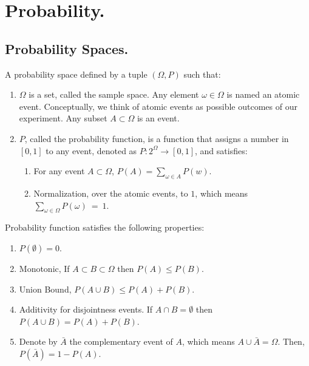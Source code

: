 


\ifdefined\BOOK
\else
\setcounter{chapter}{6}
\fi
\chapter{Probability.} 

\section{ Probability Spaces. }

\begin{definition}
  A probability space defined by a tuple $(\Omega,P)$ such that:
  \begin{enumerate} 
    \item $\Omega$ is a set, called the sample space. Any element $\omega\in \Omega$ is named an atomic event. Conceptually, we think of atomic events as possible outcomes of our experiment. Any subset $A \subset \Omega$ is an event. 
    \item $P$, called the probability function, is a function that assigns a number in $[0,1]$ to any event, denoted as $P : 2^\Omega \rightarrow [0,1]$, and satisfies:
      \begin{enumerate}
        \item For any event $A \subset \Omega$, $P(A) = \sum_{\omega\in A}P(w)$. 
        \item Normalization, over the atomic events, to $1$, which means $\sum_{\omega\in\Omega}P(\omega)~=~1$.
      \end{enumerate}
  \end{enumerate}
\end{definition}

\begin{example}
\end{example}

\begin{claim}
Probability function  satisfies the following properties:
\begin{enumerate}
  \item $P(\emptyset) = 0$.
  \item Monotonic, If $A \subset B \subset \Omega$ then $P(A) \le P(B)$.
  \item Union Bound, $P(A \cup B) \le P(A) + P(B)$.
  \item Additivity for disjointness events. If $A\cap B = \emptyset$ then $P(A \cup B) = P(A) + P(B)$.
  \item Denote by $\bar{A}$ the complementary event of $A$, which means $A\cup\bar{A} = \Omega$. Then, $P(\bar{A}) = 1 - P(A)$.
\end{enumerate}
\end{claim}


